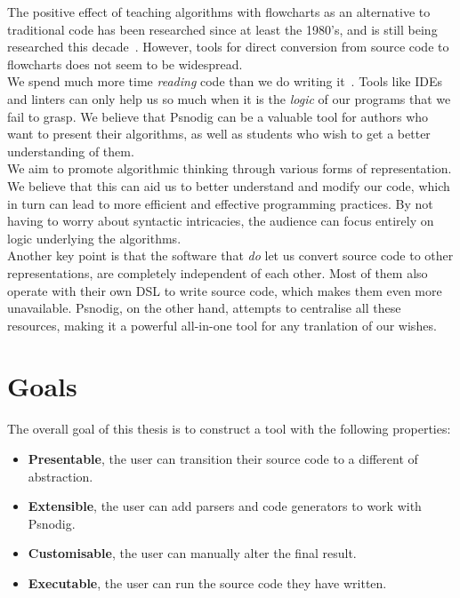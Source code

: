 The positive effect of teaching algorithms with flowcharts as an alternative to traditional code has been researched since at least the 1980's, and is still being researched this decade~\cite{flowchartsAreGood1, flowchartsAreGood2, flowchartsAreGood3}. However, tools for direct conversion from source code to flowcharts does not seem to be widespread. \\

We spend much more time \textit{reading} code than we do writing it~\cite[14]{weReadMoreThanWeCode}. Tools like IDEs and linters can only help us so much when it is the \textit{logic} of our programs that we fail to grasp. We believe that Psnodig can be a valuable tool for authors who want to present their algorithms, as well as students who wish to get a better understanding of them. \\

We aim to promote algorithmic thinking through various forms of representation. We believe that this can aid us to better understand and modify our code, which in turn can lead to more efficient and effective programming practices. By not having to worry about syntactic intricacies, the audience can focus entirely on logic underlying the algorithms. \\

Another key point is that the software that \textit{do} let us convert source code to other representations, are completely independent of each other. Most of them also operate with their own DSL to write source code, which makes them even more unavailable. Psnodig, on the other hand, attempts to centralise all these resources, making it a powerful all-in-one tool for any tranlation of our wishes. \\



\section{Goals}

The overall goal of this thesis is to construct a tool with the following properties:

\begin{itemize}
    \item \textbf{Presentable}, the user can transition their source code to a different of abstraction.
    \item \textbf{Extensible}, the user can add parsers and code generators to work with Psnodig.
    \item \textbf{Customisable}, the user can manually alter the final result.
    \item \textbf{Executable}, the user can run the source code they have written.
\end{itemize}

